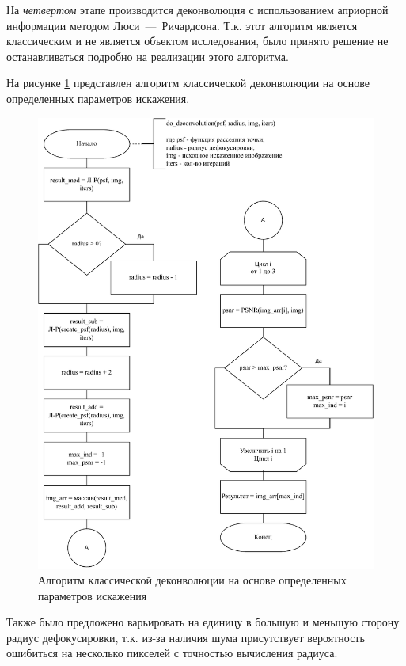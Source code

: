 На \textit{четвертом} этапе производится деконволюция с использованием априорной информации методом Люси~---~Ричардсона. Т.к. этот алгоритм является классическим и не является объектом исследования, было принято решение не останавливаться подробно на реализации этого алгоритма.

На рисунке \ref{deconvolve} представлен алгоритм классической деконволюции на основе определенных параметров искажения.

\begin{figure}[H]
	\centering
	\includegraphics[scale=0.8]{assets/deconvolve.pdf}
	\caption{Алгоритм классической деконволюции на основе определенных параметров искажения}
	\label{deconvolve}
\end{figure}

Также было предложено варьировать на единицу в большую и меньшую сторону радиус дефокусировки, т.к. из-за наличия шума присутствует вероятность ошибиться на несколько пикселей с точностью вычисления радиуса. 

